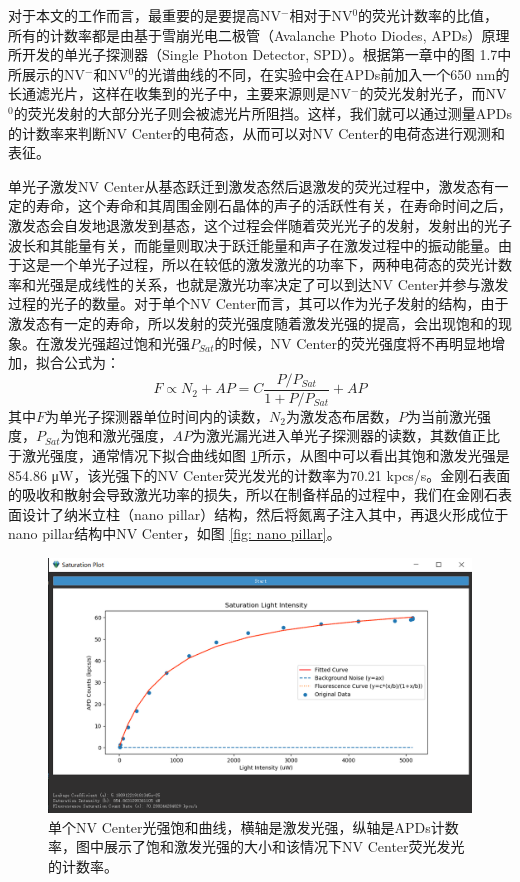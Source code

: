 \documentclass[type = bachelor]{whu-thesis}
\begin{document}
对于本文的工作而言，最重要的是要提高NV$^-$相对于NV$^0$的荧光计数率的比值，所有的计数率都是由基于雪崩光电二极管（Avalanche Photo Diodes, APDs）原理所开发的单光子探测器（Single Photon Detector, SPD）。根据第一章中的图 1.7中所展示的NV$^-$和NV$^0$的光谱曲线的不同，在实验中会在APDs前加入一个650 nm的长通滤光片，这样在收集到的光子中，主要来源则是NV$^-$的荧光发射光子，而NV$^0$的荧光发射的大部分光子则会被滤光片所阻挡。这样，我们就可以通过测量APDs的计数率来判断NV Center的电荷态，从而可以对NV Center的电荷态进行观测和表征。

单光子激发NV Center从基态跃迁到激发态然后退激发的荧光过程中，激发态有一定的寿命，这个寿命和其周围金刚石晶体的声子的活跃性有关，在寿命时间之后，激发态会自发地退激发到基态，这个过程会伴随着荧光光子的发射，发射出的光子波长和其能量有关，而能量则取决于跃迁能量和声子在激发过程中的振动能量。由于这是一个单光子过程，所以在较低的激发激光的功率下，两种电荷态的荧光计数率和光强是成线性的关系，也就是激光功率决定了可以到达NV Center并参与激发过程的光子的数量\cite{aslam2013photo}。对于单个NV Center而言，其可以作为光子发射的结构，由于激发态有一定的寿命，所以发射的荧光强度随着激发光强的提高，会出现饱和的现象。在激发光强超过饱和光强$P_{Sat}$的时候，NV Center的荧光强度将不再明显地增加，拟合公式为：
\begin{equation}
  F \propto N_2 +AP = C \frac{P/P_{Sat}}{1+P/P_{Sat}}+AP
\end{equation} 
其中$F$为单光子探测器单位时间内的读数，$N_2$为激发态布居数，$P$为当前激光强度，$P_{Sat}$为饱和激光强度，$AP$为激光漏光进入单光子探测器的读数，其数值正比于激光强度，通常情况下拟合曲线如图 \ref{fig: Saturation Plot}所示，从图中可以看出其饱和激发光强是854.86 \unit{\uW}，该光强下的NV Center荧光发光的计数率为70.21 kpcs/s。金刚石表面的吸收和散射会导致激光功率的损失，所以在制备样品的过程中，我们在金刚石表面设计了纳米立柱（nano pillar）结构，然后将氮离子注入其中，再退火形成位于nano pillar结构中NV Center，如图 \ref{fig: nano pillar}。

\begin{figure}
  \centering
  \includegraphics[width=1.0\textwidth]{figures/Chapter 2/Saturation Plot.png}
  \caption[单个NV Center光强饱和曲线]{单个NV Center光强饱和曲线，横轴是激发光强，纵轴是APDs计数率，图中展示了饱和激发光强的大小和该情况下NV Center荧光发光的计数率。}
  \label{fig: Saturation Plot}
\end{figure}
\end{document}
